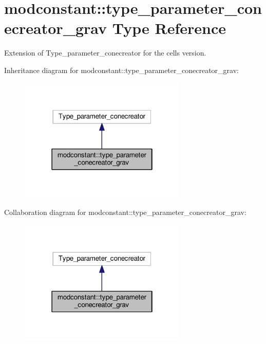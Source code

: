 \hypertarget{structmodconstant_1_1type__parameter__conecreator__grav}{\section{modconstant\-:\-:type\-\_\-parameter\-\_\-conecreator\-\_\-grav Type Reference}
\label{structmodconstant_1_1type__parameter__conecreator__grav}
}


Extension of Type\-\_\-parameter\-\_\-conecreator for the cells version.  




Inheritance diagram for modconstant\-:\-:type\-\_\-parameter\-\_\-conecreator\-\_\-grav\-:\nopagebreak
\begin{figure}[H]
\begin{center}
\leavevmode
\includegraphics[width=226pt]{structmodconstant_1_1type__parameter__conecreator__grav__inherit__graph}
\end{center}
\end{figure}


Collaboration diagram for modconstant\-:\-:type\-\_\-parameter\-\_\-conecreator\-\_\-grav\-:\nopagebreak
\begin{figure}[H]
\begin{center}
\leavevmode
\includegraphics[width=226pt]{structmodconstant_1_1type__parameter__conecreator__grav__coll__graph}
\end{center}
\end{figure}
